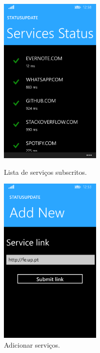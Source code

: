 \documentclass[12pt]{article}
\begin{document}
\begin{figure}[ht!]
\centering
\parbox{5cm}{
\includegraphics[width=5cm]{7.png}
\caption{Lista de serviços subscritos.}
\label{fig:2figsA}}
\qquad
\begin{minipage}{5cm}
\includegraphics[width=5cm]{6.png}
\caption{Adicionar serviços.}
\label{fig:2figsB}
\end{minipage}
\end{figure}
\end{document}
